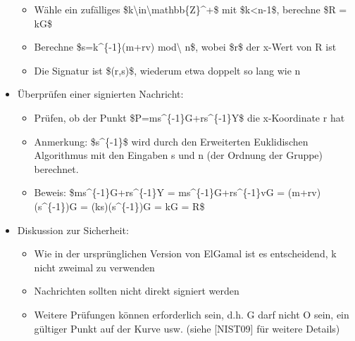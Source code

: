 \documentclass[a4paper]{article}
\begin{document}
\begin{multicols}{3}
\begin{itemize}
              \begin{itemize}
                  \item
                        Wähle ein zufälliges
                        \$k\textbackslash in\textbackslash mathbb\{Z\}\^{}+\$ mit
                        \$k\textless n-1\$, berechne \$R = kG\$
                  \item
                        Berechne \$s=k\^{}\{-1\}(m+rv) mod\textbackslash{} n\$, wobei \$r\$
                        der x-Wert von R ist
                  \item
                        Die Signatur ist \$(r,s)\$, wiederum etwa doppelt so lang wie n
              \end{itemize}
        \item
              Überprüfen einer signierten Nachricht:

              \begin{itemize}
                  \item
                        Prüfen, ob der Punkt \$P=ms\^{}\{-1\}G+rs\^{}\{-1\}Y\$ die
                        x-Koordinate r hat
                  \item
                        Anmerkung: \$s\^{}\{-1\}\$ wird durch den Erweiterten Euklidischen
                        Algorithmus mit den Eingaben s und n (der Ordnung der Gruppe)
                        berechnet.
                  \item
                        Beweis: \$ms\^{}\{-1\}G+rs\^{}\{-1\}Y = ms\^{}\{-1\}G+rs\^{}\{-1\}vG
                        = (m+rv)(s\^{}\{-1\})G = (ks)(s\^{}\{-1\})G = kG = R\$
              \end{itemize}
        \item
              Diskussion zur Sicherheit:

              \begin{itemize}
                  \item
                        Wie in der ursprünglichen Version von ElGamal ist es entscheidend, k
                        nicht zweimal zu verwenden
                  \item
                        Nachrichten sollten nicht direkt signiert werden
                  \item
                        Weitere Prüfungen können erforderlich sein, d.h. G darf nicht O
                        sein, ein gültiger Punkt auf der Kurve usw. (siehe {[}NIST09{]} für
                        weitere Details)
              \end{itemize}
    \end{itemize}



\end{multicols}
\end{document}
